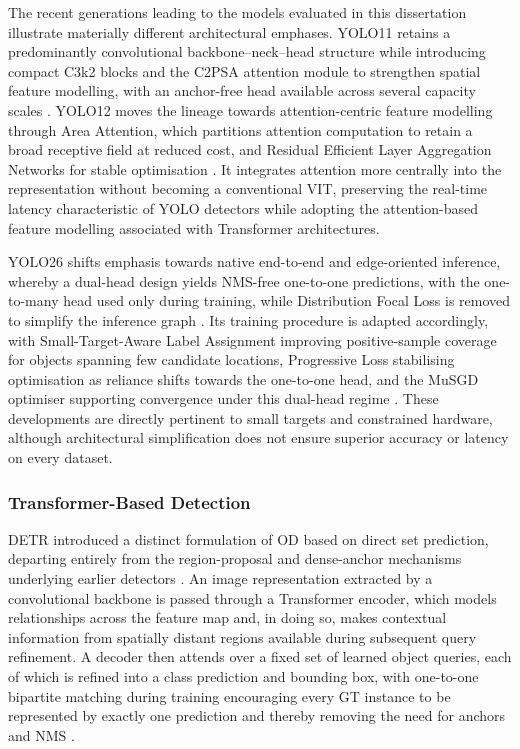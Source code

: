 \newpage
\noindent The recent generations leading to the models evaluated in this dissertation illustrate materially different architectural emphases. \gls{YOLO}11 retains a predominantly convolutional backbone--neck--head structure while introducing compact C3k2 blocks and the C2PSA attention module to strengthen spatial feature modelling, with an anchor-free head available across several capacity scales \cite{yolo11}. \gls{YOLO}12 moves the lineage towards attention-centric feature modelling through Area Attention, which partitions attention computation to retain a broad receptive field at reduced cost, and Residual Efficient Layer Aggregation Networks for stable optimisation \cite{tian2025yolov12}. It integrates attention more centrally into the representation without becoming a conventional \gls{VIT}, preserving the real-time latency characteristic of \gls{YOLO} detectors while adopting the attention-based feature modelling associated with Transformer architectures.

\gls{YOLO}26 shifts emphasis towards native end-to-end and edge-oriented inference, whereby a dual-head design yields \gls{NMS}-free one-to-one predictions, with the one-to-many head used only during training, while Distribution Focal Loss is removed to simplify the inference graph \cite{jocher2026yolo26}. Its training procedure is adapted accordingly, with Small-Target-Aware Label Assignment improving positive-sample coverage for objects spanning few candidate locations, Progressive Loss stabilising optimisation as reliance shifts towards the one-to-one head, and the \gls{MuSGD} optimiser supporting convergence under this dual-head regime \cite{jocher2026yolo26}. These developments are directly pertinent to small targets and constrained hardware, although architectural simplification does not ensure superior accuracy or latency on every dataset.

\subsubsection{Transformer-Based Detection}
\label{sec:bg-transformer-detection}
\gls{DETR} introduced a distinct formulation of \gls{OD} based on direct set prediction, departing entirely from the region-proposal and dense-anchor mechanisms underlying earlier detectors \cite{carion2020end}. An image representation extracted by a convolutional backbone is passed through a Transformer encoder, which models relationships across the feature map and, in doing so, makes contextual information from spatially distant regions available during subsequent query refinement. A decoder then attends over a fixed set of learned object queries, each of which is refined into a class prediction and bounding box, with one-to-one bipartite matching during training encouraging every \gls{GT} instance to be represented by exactly one prediction and thereby removing the need for anchors and \gls{NMS} \cite{carion2020end,yu2025detrreview}.


